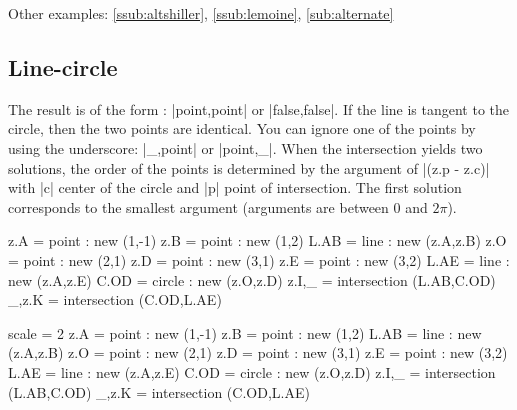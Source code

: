 Other examples: \ref{ssub:altshiller}, \ref{ssub:lemoine}, \ref{sub:alternate}

\newpage
\subsection{Line-circle} %
\label{sub:line_circle}
The result is of the form : |point,point| or |false,false|. If the line is tangent to the circle, then the two points are identical. You can ignore one of the points by using the underscore: |_,point| or |point,_|. When the intersection yields two solutions, the order of the points is determined by the argument of |(z.p - z.c)| with |c| center of the circle and |p| point of intersection. The first solution corresponds to the smallest argument (arguments are between 0 and $2\pi$).

\begin{minipage}{0.6\textwidth}
\begin{tkzexample}
\begin{tkzelements}
   z.A   = point : new (1,-1)
   z.B   = point : new (1,2)
   L.AB  = line : new (z.A,z.B)
   z.O   = point : new (2,1)
   z.D   = point : new (3,1)
   z.E   = point : new (3,2)
   L.AE  = line : new (z.A,z.E)
   C.OD  = circle : new (z.O,z.D)
   z.I,_ = intersection (L.AB,C.OD)
   _,z.K = intersection (C.OD,L.AE)
\end{tkzelements}

\end{tkzexample}
\end{minipage}
\begin{minipage}{0.4\textwidth}
\begin{tkzelements}
   scale = 2
z.A = point : new (1,-1)
z.B = point : new (1,2)
L.AB = line : new (z.A,z.B)
z.O = point : new (2,1)
z.D = point : new (3,1)
z.E = point : new (3,2)
L.AE = line : new (z.A,z.E)
C.OD = circle : new (z.O,z.D)
z.I,_ = intersection (L.AB,C.OD)
_,z.K = intersection (C.OD,L.AE)
\end{tkzelements}

\end{minipage}

